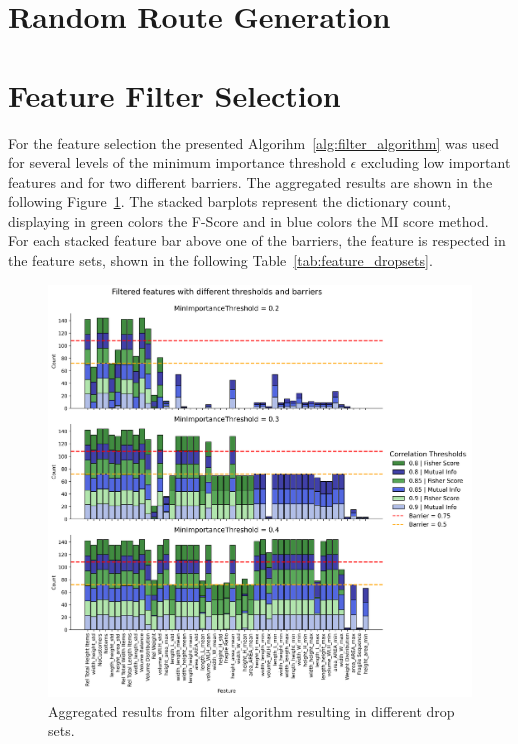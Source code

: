 \clearpage
\section{Random Route Generation}
\label{chap:appendix:RRG}


\clearpage
\section{Feature Filter Selection}
\label{app:feature_selection}

For the feature selection the presented Algorihm~\ref{alg:filter_algorithm} was used for several levels of the minimum importance threshold
$\epsilon$ excluding low important features and for two different barriers. The aggregated results are shown in the following Figure~\ref{fig:feature_filter_parameters}.
The stacked barplots represent the dictionary count, displaying in green colors the \gls{F-Score} and in blue colors the \gls{MI} score method.
For each stacked feature bar above one of the barriers, the feature is respected in the feature sets, shown in the following Table~\ref{tab:feature_dropsets}.

\begin{figure}[ht]
    \centering
    \includegraphics[width=\textwidth,height=0.75\textheight,keepaspectratio]{pictures/feature_filter_facePlot.png}
    \caption{Aggregated results from filter algorithm resulting in different drop sets.}
    \label{fig:feature_filter_parameters}
\end{figure}

